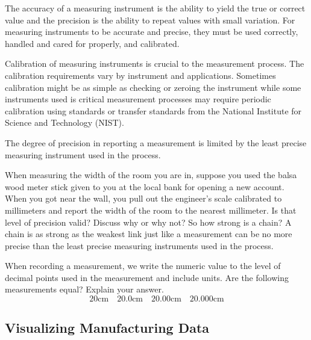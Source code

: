 \documentclass{ximera}
\begin{document}
The accuracy of a measuring instrument is the ability to yield the true or correct value and the precision is the ability to repeat values with small variation. For measuring instruments to be accurate and precise, they must be used correctly, handled and cared for properly, and calibrated. 

Calibration of measuring instruments is crucial to the measurement process. The calibration requirements vary by instrument and applications. Sometimes calibration might be as simple as checking or zeroing the instrument while some instruments used is critical measurement processes may require periodic calibration using standards or transfer standards from the National Institute for Science and Technology (NIST).
    
The degree of precision in reporting a measurement is limited by the least precise measuring instrument used in the process. 
\begin{question}\label{q:lengthOfRoom}
When measuring the width of the room you are in, suppose you used the balsa wood meter stick given to you at the local bank for opening a new account.  When you got near the wall, you pull out the engineer’s scale calibrated to millimeters and report the width of the room to the nearest millimeter.  Is that level of precision valid?  Discuss why or why not?   So how strong is a chain?  A chain is as strong as the weakest link just like a measurement can be no more precise than the least precise measuring instruments used in the process. 
\end{question}

\begin{question}\label{q:equalLength}
When recording a measurement, we write the numeric value to the level of decimal points used in the measurement and include units. Are the following measurements equal?  Explain your answer.   
$$20\text{cm}\quad 20.0\text{cm}\quad 20.00\text{cm}\quad 20.000\text{cm} $$

\begin{multipleChoice} 
\end{multipleChoice} 
\end{question}

\subsection*{Visualizing Manufacturing Data}
\end{document}
